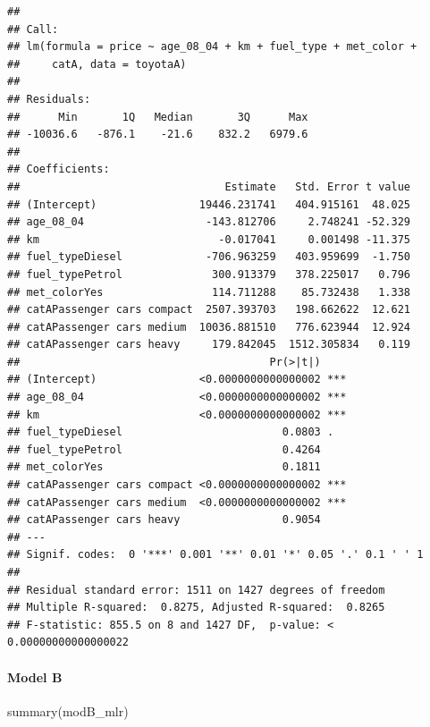 \documentclass[
]{article}
\newenvironment{Shaded}{\begin{snugshade}}{\end{snugshade}}
\newcommand{\FunctionTok}[1]{\textcolor[rgb]{0.00,0.00,0.00}{#1}}
\newcommand{\NormalTok}[1]{#1}
\begin{document}
\begin{verbatim}
## 
## Call:
## lm(formula = price ~ age_08_04 + km + fuel_type + met_color + 
##     catA, data = toyotaA)
## 
## Residuals:
##      Min       1Q   Median       3Q      Max 
## -10036.6   -876.1    -21.6    832.2   6979.6 
## 
## Coefficients:
##                                Estimate   Std. Error t value
## (Intercept)                19446.231741   404.915161  48.025
## age_08_04                   -143.812706     2.748241 -52.329
## km                            -0.017041     0.001498 -11.375
## fuel_typeDiesel             -706.963259   403.959699  -1.750
## fuel_typePetrol              300.913379   378.225017   0.796
## met_colorYes                 114.711288    85.732438   1.338
## catAPassenger cars compact  2507.393703   198.662622  12.621
## catAPassenger cars medium  10036.881510   776.623944  12.924
## catAPassenger cars heavy     179.842045  1512.305834   0.119
##                                       Pr(>|t|)    
## (Intercept)                <0.0000000000000002 ***
## age_08_04                  <0.0000000000000002 ***
## km                         <0.0000000000000002 ***
## fuel_typeDiesel                         0.0803 .  
## fuel_typePetrol                         0.4264    
## met_colorYes                            0.1811    
## catAPassenger cars compact <0.0000000000000002 ***
## catAPassenger cars medium  <0.0000000000000002 ***
## catAPassenger cars heavy                0.9054    
## ---
## Signif. codes:  0 '***' 0.001 '**' 0.01 '*' 0.05 '.' 0.1 ' ' 1
## 
## Residual standard error: 1511 on 1427 degrees of freedom
## Multiple R-squared:  0.8275, Adjusted R-squared:  0.8265 
## F-statistic: 855.5 on 8 and 1427 DF,  p-value: < 0.00000000000000022
\end{verbatim}

\hypertarget{model-b-8}{%
\paragraph{Model B}\label{model-b-8}}

\begin{Shaded}
\begin{Highlighting}[]
\FunctionTok{summary}\NormalTok{(modB\_mlr)}
\end{Highlighting}
\end{Shaded}
\end{document}
